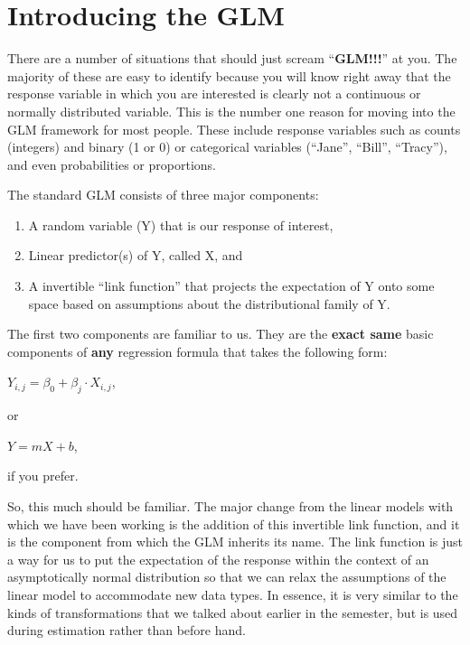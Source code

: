 \documentclass[
]{book}
\begin{document}
\hypertarget{introducing-the-glm}{%
\section{Introducing the GLM}\label{introducing-the-glm}}

There are a number of situations that should just scream ``\textbf{GLM!!!}'' at you. The majority of these are easy to identify because you will know right away that the response variable in which you are interested is clearly not a continuous or normally distributed variable. This is the number one reason for moving into the GLM framework for most people. These include response variables such as counts (integers) and binary (1 or 0) or categorical variables (``Jane'', ``Bill'', ``Tracy''), and even probabilities or proportions.

The standard GLM consists of three major components:

\begin{enumerate}
\def\labelenumi{\arabic{enumi}.}
\item
  A random variable (Y) that is our response of interest,
\item
  Linear predictor(s) of Y, called X, and
\item
  A invertible ``link function'' that projects the expectation of Y onto some space based on assumptions about the distributional family of Y.
\end{enumerate}

The first two components are familiar to us. They are the \textbf{exact same} basic components of \textbf{any} regression formula that takes the following form:

\(Y_{i,j} = \beta_0 + \beta_j \cdot X_{i,j}\),

or

\(Y = mX + b\),

if you prefer.

So, this much should be familiar. The major change from the linear models with which we have been working is the addition of this invertible link function, and it is the component from which the GLM inherits its name. The link function is just a way for us to put the expectation of the response within the context of an asymptotically normal distribution so that we can relax the assumptions of the linear model to accommodate new data types. In essence, it is very similar to the kinds of transformations that we talked about earlier in the semester, but is used during estimation rather than before hand.
\end{document}
